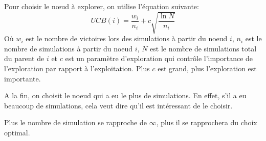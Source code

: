 Pour choisir le nœud à explorer, on utilise l'équation suivante: 
\begin{equation} 
    UCB(i) = \frac{w_i}{n_i} + c \sqrt{\frac{\ln N}{n_i}} 
\end{equation}
Où $w_i$ est le nombre de victoires lors des simulations à partir du noeud $i$, $n_i$ est le nombre de simulations à partir du noeud $i$,
$N$ est le nombre de simulations total du parent de $i$ et $c$ est un paramètre d'exploration qui contrôle l'importance de l'exploration par rapport à l'exploitation. 
Plus $c$ est grand, plus l'exploration est importante. 


A la fin, on choisit le noeud qui a eu le plus de simulations. En effet, 
s'il a eu beaucoup de simulations, cela veut dire qu'il est intéressant de le choisir.

\begin{note}
    Plus le nombre de simulation se rapproche de $\infty$, plus il se rapprochera du choix optimal.
\end{note}




